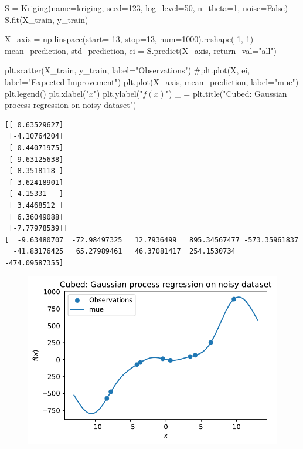 \documentclass[
  letterpaper,
  DIV=11,
  numbers=noendperiod]{scrreprt}
\newenvironment{Shaded}{\begin{snugshade}}{\end{snugshade}}
\newcommand{\CommentTok}[1]{\textcolor[rgb]{0.37,0.37,0.37}{#1}}
\newcommand{\DecValTok}[1]{\textcolor[rgb]{0.68,0.00,0.00}{#1}}
\newcommand{\NormalTok}[1]{\textcolor[rgb]{0.00,0.23,0.31}{#1}}
\newcommand{\OperatorTok}[1]{\textcolor[rgb]{0.37,0.37,0.37}{#1}}
\newcommand{\StringTok}[1]{\textcolor[rgb]{0.13,0.47,0.30}{#1}}
\newcommand{\VariableTok}[1]{\textcolor[rgb]{0.07,0.07,0.07}{#1}}
\begin{document}
\begin{Shaded}
\begin{Highlighting}[]
\NormalTok{S }\OperatorTok{=}\NormalTok{ Kriging(name}\OperatorTok{=}\StringTok{\textquotesingle{}kriging\textquotesingle{}}\NormalTok{,  seed}\OperatorTok{=}\DecValTok{123}\NormalTok{, log\_level}\OperatorTok{=}\DecValTok{50}\NormalTok{, n\_theta}\OperatorTok{=}\DecValTok{1}\NormalTok{, noise}\OperatorTok{=}\VariableTok{False}\NormalTok{)}
\NormalTok{S.fit(X\_train, y\_train)}

\NormalTok{X\_axis }\OperatorTok{=}\NormalTok{ np.linspace(start}\OperatorTok{={-}}\DecValTok{13}\NormalTok{, stop}\OperatorTok{=}\DecValTok{13}\NormalTok{, num}\OperatorTok{=}\DecValTok{1000}\NormalTok{).reshape(}\OperatorTok{{-}}\DecValTok{1}\NormalTok{, }\DecValTok{1}\NormalTok{)}
\NormalTok{mean\_prediction, std\_prediction, ei }\OperatorTok{=}\NormalTok{ S.predict(X\_axis, return\_val}\OperatorTok{=}\StringTok{"all"}\NormalTok{)}

\NormalTok{plt.scatter(X\_train, y\_train, label}\OperatorTok{=}\StringTok{"Observations"}\NormalTok{)}
\CommentTok{\#plt.plot(X, ei, label="Expected Improvement")}
\NormalTok{plt.plot(X\_axis, mean\_prediction, label}\OperatorTok{=}\StringTok{"mue"}\NormalTok{)}
\NormalTok{plt.legend()}
\NormalTok{plt.xlabel(}\StringTok{"$x$"}\NormalTok{)}
\NormalTok{plt.ylabel(}\StringTok{"$f(x)$"}\NormalTok{)}
\NormalTok{\_ }\OperatorTok{=}\NormalTok{ plt.title(}\StringTok{"Cubed: Gaussian process regression on noisy dataset"}\NormalTok{)}
\end{Highlighting}
\end{Shaded}

\begin{verbatim}
[[ 0.63529627]
 [-4.10764204]
 [-0.44071975]
 [ 9.63125638]
 [-8.3518118 ]
 [-3.62418901]
 [ 4.15331   ]
 [ 3.4468512 ]
 [ 6.36049088]
 [-7.77978539]]
[  -9.63480707  -72.98497325   12.7936499   895.34567477 -573.35961837
  -41.83176425   65.27989461   46.37081417  254.1530734  -474.09587355]
\end{verbatim}

\begin{figure}[H]

{\centering \includegraphics{07_spot_ei_files/figure-pdf/cell-54-output-2.pdf}

}

\end{figure}
\end{document}
